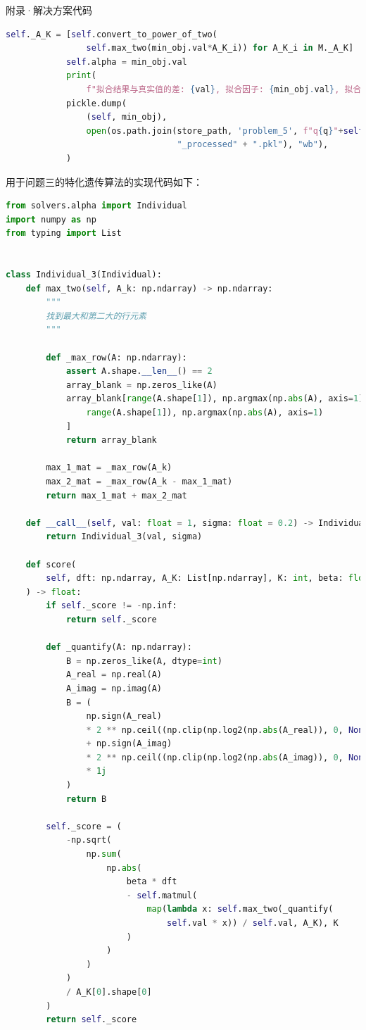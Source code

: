 \documentclass[11pt]{article}
\begin{document}
\begin{section}{附录·解决方案代码}
\begin{lstlisting}[language=Python]
            self._A_K = [self.convert_to_power_of_two(
                self.max_two(min_obj.val*A_K_i)) for A_K_i in M._A_K]
            self.alpha = min_obj.val
            print(
                f"拟合结果与真实值的差: {val}, 拟合因子: {min_obj.val}, 拟合因子的标准差: {min_obj.sigma}")
            pickle.dump(
                (self, min_obj),
                open(os.path.join(store_path, 'problem_5', f"q{q}"+self.__name__ +
                                  "_processed" + ".pkl"), "wb"),
            )

 \end{lstlisting}
 用于问题三的特化遗传算法的实现代码如下：
 \begin{lstlisting}[language=Python]
  from solvers.alpha import Individual
import numpy as np
from typing import List


class Individual_3(Individual):
    def max_two(self, A_k: np.ndarray) -> np.ndarray:
        """
        找到最大和第二大的行元素
        """

        def _max_row(A: np.ndarray):
            assert A.shape.__len__() == 2
            array_blank = np.zeros_like(A)
            array_blank[range(A.shape[1]), np.argmax(np.abs(A), axis=1)] = A[
                range(A.shape[1]), np.argmax(np.abs(A), axis=1)
            ]
            return array_blank

        max_1_mat = _max_row(A_k)
        max_2_mat = _max_row(A_k - max_1_mat)
        return max_1_mat + max_2_mat

    def __call__(self, val: float = 1, sigma: float = 0.2) -> Individual:
        return Individual_3(val, sigma)

    def score(
        self, dft: np.ndarray, A_K: List[np.ndarray], K: int, beta: float
    ) -> float:
        if self._score != -np.inf:
            return self._score

        def _quantify(A: np.ndarray):
            B = np.zeros_like(A, dtype=int)
            A_real = np.real(A)
            A_imag = np.imag(A)
            B = (
                np.sign(A_real)
                * 2 ** np.ceil((np.clip(np.log2(np.abs(A_real)), 0, None)) - 1)
                + np.sign(A_imag)
                * 2 ** np.ceil((np.clip(np.log2(np.abs(A_imag)), 0, None)) - 1)
                * 1j
            )
            return B

        self._score = (
            -np.sqrt(
                np.sum(
                    np.abs(
                        beta * dft
                        - self.matmul(
                            map(lambda x: self.max_two(_quantify(
                                self.val * x)) / self.val, A_K), K
                        )
                    )
                )
            )
            / A_K[0].shape[0]
        )
        return self._score


\end{lstlisting}
\end{section}
\end{document}
